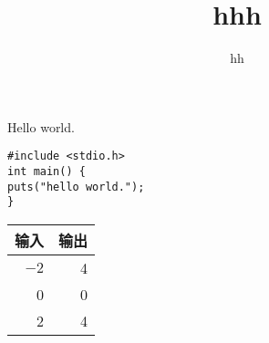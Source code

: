 \documentclass{article}
\begin{document}
\title{hhh}
\author{hh}
\maketitle
Hello world.
\begin{verbatim}
#include <stdio.h>
int main() {
puts("hello world.");
}
\end{verbatim}

\begin{tabular}{|rr|}
\hline
输入& 输出\\ \hline
$-2$ & 4 \\
0 & 0 \\
2 & 4 \\ \hline
\end{tabular}
\end{document}
